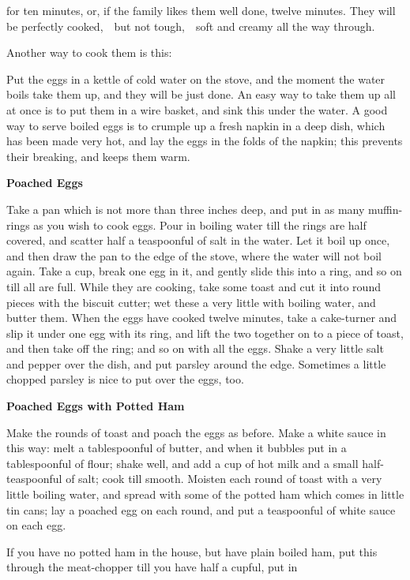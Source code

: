 \documentclass[11pt]{book}
\newcommand{\indpar}{\par\noindent\hspace*{\parindent}}
\newcommand{\instruction}{\indpar}
\newenvironment{RecipeTitle}{\medskip\begin{center}\large\bf }{\end{center}\smallskip}
\begin{document}
for ten minutes, or, if the family likes them well done, twelve minutes.
They will be perfectly cooked,\ \  but not tough,\ \  soft and creamy all the
way through.
\instruction
  Another way to cook them is this:
\instruction
  Put the eggs in a kettle of cold water on the stove, and the moment
the water boils take them up, and they will be just done.  An easy way
to take them up all at once is to put them in a wire basket, and sink
this under the water.  A good way to serve boiled eggs is to crumple
up a fresh napkin in a deep dish, which has been made very hot, and lay
the eggs in the folds of the napkin; this prevents their breaking, and
keeps them warm.\pagebreak[2]
\begin{RecipeTitle}
Poached Eggs\label{poached_eggs}
\end{RecipeTitle}
\instruction
  Take a pan which is not more than three inches deep, and put in as
many muffin-rings as you wish to cook eggs.  Pour in boiling water till
the rings are half covered, and scatter half a teaspoonful of salt in
the water.  Let it boil up once, and then draw the pan to the edge of
the stove, where the water will not boil again.  Take a cup, break one
egg in it, and gently slide this into a ring, and so on till all are
full.  While they are cooking, take some toast and cut it into round
pieces with the biscuit cutter; wet these a very little with boiling
water, and butter them.  When the eggs have cooked twelve minutes,
take a cake-turner and slip it under one egg with its ring, and lift
the two together on to a piece of toast, and then take off the ring;
and so on with all the eggs.  Shake a very little salt and pepper
over the dish, and put parsley around the edge.  Sometimes a little
chopped parsley is nice to put over the eggs, too.
\begin{RecipeTitle}
Poached Eggs with Potted Ham\label{poached_eggs_with_potted_ham}
\end{RecipeTitle}
\instruction
  Make the rounds of toast and poach the eggs as before.  Make a white
sauce in this way: melt a tablespoonful of butter, and when it bubbles
put in a tablespoonful of flour; shake well, and add a cup of hot milk
and a small half-teaspoonful of salt; cook till smooth.  Moisten each
round of toast with a very little boiling water, and spread with some
of the potted ham which comes in little tin cans; lay a poached egg on
each round, and put a teaspoonful of white sauce on each egg.
\instruction
  If you have no potted ham in the house, but have plain boiled ham,
put this through the meat-chopper till you have half a cupful, put in
\end{document}
